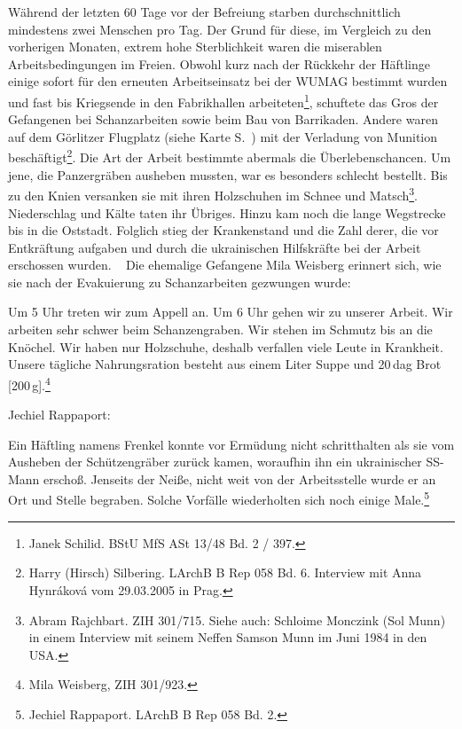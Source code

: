 

Während der letzten 60 Tage vor der Befreiung starben durchschnittlich mindestens zwei Menschen pro Tag. Der Grund für diese, im Vergleich zu den vorherigen Monaten, extrem hohe Sterblichkeit waren die miserablen Arbeitsbedingungen im Freien. Obwohl kurz nach der Rückkehr der Häftlinge einige sofort für den erneuten Arbeitseinsatz bei der WUMAG bestimmt wurden und fast bis Kriegsende in den Fabrikhallen arbeiteten\footnote{Janek Schilid. BStU MfS ASt 13/48 Bd. 2 / 397.}, schuftete das Gros der Gefangenen bei Schanzarbeiten sowie beim Bau von Barrikaden. Andere waren auf dem Görlitzer Flugplatz (siehe Karte S.~\pageref{map_goerlitz}) mit der Verladung von Munition beschäftigt\footnote{Harry (Hirsch) Silbering. LArchB B Rep 058 Bd. 6. Interview mit Anna Hynr\'akov\'a vom 29.03.2005 in Prag.}.
\newline
Die Art der Arbeit bestimmte abermals die Überlebenschancen. Um jene, die Panzergräben ausheben mussten, war es besonders schlecht bestellt. Bis zu den Knien versanken sie mit ihren Holzschuhen im Schnee und Matsch\footnote{Abram Rajchbart. ZIH 301/715. Siehe auch: Schloime Monczink (Sol Munn) in einem Interview mit seinem Neffen Samson Munn im Juni 1984 in den USA.}. Niederschlag und Kälte taten ihr Übriges. Hinzu kam noch die lange Wegstrecke bis in die Oststadt. Folglich stieg der Krankenstand und die Zahl derer, die vor Entkräftung aufgaben und durch die ukrainischen Hilfskräfte bei der Arbeit erschossen wurden. 
~\newline
Die ehemalige Gefangene Mila Weisberg erinnert sich, wie sie nach der Evakuierung zu Schanzarbeiten gezwungen wurde: 
\begin{leftbar} 
Um 5 Uhr treten wir zum Appell an. Um 6 Uhr gehen wir zu unserer Arbeit. Wir arbeiten sehr schwer beim Schanzengraben. Wir stehen im Schmutz bis an die Knöchel. Wir haben nur Holzschuhe, deshalb verfallen viele Leute in Krankheit. Unsere tägliche Nahrungsration besteht aus einem Liter Suppe und 20\,dag Brot [200\,g].\footnote{Mila Weisberg, ZIH 301/923.}
\end{leftbar}
Jechiel Rappaport:
\begin{leftbar} 
Ein Häftling namens Frenkel konnte vor Ermüdung nicht schritthalten als sie vom Ausheben der Schützengräber zurück kamen, woraufhin ihn ein ukrainischer SS-Mann erschoß. Jenseits der Neiße, nicht weit von der Arbeitsstelle wurde er an Ort und Stelle begraben. Solche Vorfälle wiederholten sich noch einige Male.\footnote{Jechiel Rappaport. LArchB B Rep 058 Bd. 2.}
\end{leftbar}

